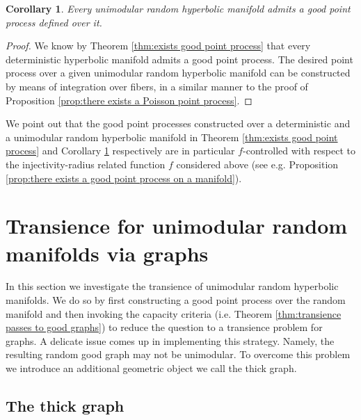 \documentclass{amsart}
\theoremstyle{plain}
\newtheorem{remark}[theorem]{Remark}
\newtheorem{cor}[theorem]{Corollary}
\numberwithin{equation}{section}
\theoremstyle{definition}
\begin{document}
\begin{cor}
\label{cor:exists good point process of unimodular}
Every unimodular random hyperbolic manifold admits a good point process defined over it.
\end{cor}
\begin{proof}
We know by Theorem \ref{thm:exists good point process} that every deterministic hyperbolic manifold admits a good point process. The desired point process over a given unimodular random hyperbolic manifold can be constructed by means of integration over fibers, in a similar manner to the proof of Proposition \ref{prop:there exists a Poisson point process}.
\end{proof} 

We point out that the good point processes constructed over a deterministic and a unimodular random hyperbolic manifold in Theorem \ref{thm:exists good point process} and Corollary \ref{cor:exists good point process of unimodular} respectively are in particular $f$-controlled with respect to the injectivity-radius related function $f$ considered above (see e.g. Proposition \ref{prop:there exists a good point process on a manifold}).

\section{Transience for unimodular random manifolds via graphs}
\label{sec:transience for manifolds via graphs}

In this section we investigate the transience of unimodular random hyperbolic manifolds. We do so by first constructing a good point process over the random manifold and then invoking the capacity criteria (i.e. Theorem \ref{thm:transience passes to good graphs}) to reduce the question to a transience problem for graphs. 
A delicate issue comes up in  implementing this strategy. Namely,  the resulting random good graph may not be unimodular. To overcome this problem we introduce an additional geometric object  we call the thick graph.


\subsection{The thick graph}

\end{document}
